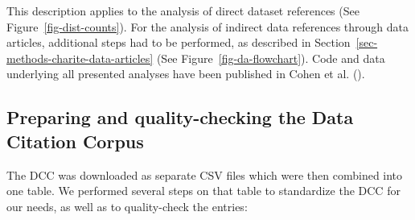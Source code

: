 \documentclass[
  letterpaper,
  DIV=11,
  numbers=noendperiod]{scrartcl}
\begin{document}
This description applies to the analysis of direct dataset references
(See Figure~\ref{fig-dist-counts}). For the analysis of indirect data
references through data articles, additional steps had to be performed,
as described in Section~\ref{sec-methods-charite-data-articles} (See
Figure~\ref{fig-da-flowchart}). Code and data underlying all presented
analyses have been published in Cohen et al.
().

\subsection{Preparing and quality-checking the Data Citation
Corpus}\label{sec-methods-dcc}

The DCC was downloaded as separate CSV files which were then combined
into one table. We performed several steps on that table to standardize
the DCC for our needs, as well as to quality-check the entries:
\end{document}
